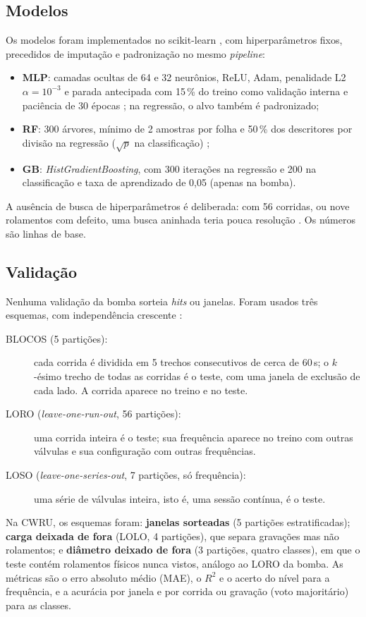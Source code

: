 \documentclass[12pt]{article}
\begin{document}
\subsection{Modelos}
\label{subsec:modelos}

Os modelos foram implementados no scikit-learn \cite{pedregosa2011}, com hiperparâmetros fixos, precedidos de imputação e padronização no mesmo \textit{pipeline}:
\begin{itemize}
	\item \textbf{MLP}: camadas ocultas de 64 e 32 neurônios, ReLU, Adam, penalidade L2 \(\alpha = 10^{-3}\) e parada antecipada com 15\,\% do treino como validação interna e paciência de 30 épocas \cite{prechelt1998}; na regressão, o alvo também é padronizado;
	\item \textbf{RF}: 300 árvores, mínimo de 2 amostras por folha e 50\,\% dos descritores por divisão na regressão (\(\sqrt{p}\) na classificação) \cite{breiman2001};
	\item \textbf{GB}: \textit{HistGradientBoosting}, com 300 iterações na regressão e 200 na classificação e taxa de aprendizado de 0,05 \cite{friedman2001} (apenas na bomba).
\end{itemize}
A ausência de busca de hiperparâmetros é deliberada: com 56 corridas, ou nove rolamentos com defeito, uma busca aninhada teria pouca resolução \cite{varma2006}. Os números são linhas de base.

\subsection{Validação}
\label{subsec:validacao}

Nenhuma validação da bomba sorteia \textit{hits} ou janelas. Foram usados três esquemas, com independência crescente \cite{roberts2017}:
\begin{description}
	\item[BLOCOS (5 partições):] cada corrida é dividida em 5 trechos consecutivos de cerca de 60\,s; o \(k\)-ésimo trecho de todas as corridas é o teste, com uma janela de exclusão de cada lado. A corrida aparece no treino e no teste.
	\item[LORO (\textit{leave-one-run-out}, 56 partições):] uma corrida inteira é o teste; sua frequência aparece no treino com outras válvulas e sua configuração com outras frequências.
	\item[LOSO (\textit{leave-one-series-out}, 7 partições, só frequência):] uma série de válvulas inteira, isto é, uma sessão contínua, é o teste.
\end{description}
Na CWRU, os esquemas foram: \textbf{janelas sorteadas} (5 partições estratificadas); \textbf{carga deixada de fora} (LOLO, 4 partições), que separa gravações mas não rolamentos; e \textbf{diâmetro deixado de fora} (3 partições, quatro classes), em que o teste contém rolamentos físicos nunca vistos, análogo ao LORO da bomba. As métricas são o erro absoluto médio (MAE), o \(R^2\) e o acerto do nível para a frequência, e a acurácia por janela e por corrida ou gravação (voto majoritário) para as classes.
\end{document}
